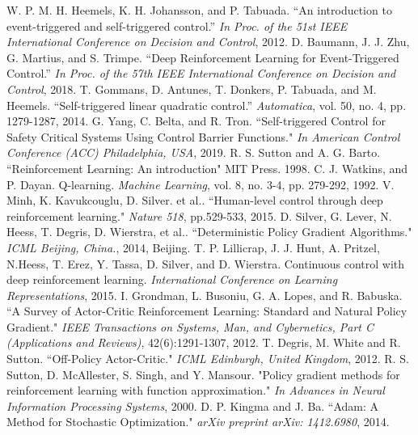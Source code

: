 \documentclass[english, dvipdfmx]{ampmt}             %
\begin{document}
\begin{thebibliography}{20}
W. P. M. H. Heemels, K. H. Johansson, and P. Tabuada. “An introduction to event-triggered and self-triggered control.” \textit{In Proc. of the 51st IEEE International Conference on Decision and Control}, 2012.
D. Baumann, J. J. Zhu, G. Martius, and S. Trimpe. “Deep Reinforcement Learning for Event-Triggered Control.”  \textit{In Proc. of the 57th IEEE International Conference on Decision and Control}, 2018.
T. Gommans, D. Antunes, T. Donkers, P. Tabuada, and M. Heemels. “Self-triggered linear quadratic control.” \textit{Automatica}, vol. 50, no. 4, pp. 1279-1287, 2014.
G. Yang, C. Belta, and R. Tron. “Self-triggered Control for Safety Critical Systems Using Control Barrier Functions."  \textit{In American Control Conference (ACC) Philadelphia, USA}, 2019.
R. S. Sutton and A. G. Barto. “Reinforcement Learning: An introduction" MIT Press. 1998.
C. J. Watkins, and P. Dayan. Q-learning. \textit{Machine Learning}, vol. 8, no. 3-4, pp. 279-292, 1992.
V. Minh, K. Kavukcouglu, D. Silver. et al.. “Human-level control through deep reinforcement learning." \textit{Nature 518}, pp.529-533, 2015.
D. Silver, G. Lever, N. Heess, T. Degris, D. Wierstra, et al.. “Deterministic Policy Gradient Algorithms." \textit{ICML Beijing, China.}, 2014, Beijing.
T. P. Lillicrap, J. J. Hunt, A. Pritzel, N.Heess, T. Erez, Y. Tassa, D. Silver, and D. Wierstra. Continuous control with deep reinforcement learning. \textit{International Conference on Learning Representations}, 2015.
I. Grondman, L. Busoniu, G. A. Lopes, and R. Babuska. “A Survey of Actor-Critic Reinforcement Learning: Standard and Natural Policy Gradient." \textit{IEEE Transactions on Systems, Man, and Cybernetics, Part C (Applications and Reviews)}, 42(6):1291-1307, 2012.
T. Degris, M. White and R. Sutton. “Off-Policy Actor-Critic." \textit{ICML Edinburgh, United Kingdom}, 2012.
R. S. Sutton, D. McAllester, S. Singh, and Y. Mansour. "Policy gradient methods for reinforcement learning with function approximation." \textit{In Advances in Neural Information Processing Systems}, 2000.
D. P. Kingma and J. Ba. “Adam: A Method for Stochastic Optimization." \textit{arXiv preprint arXiv: 1412.6980}, 2014.

\end{thebibliography}
\end{document}
